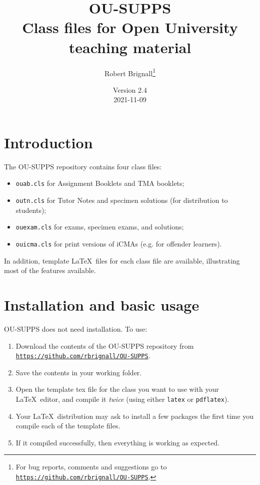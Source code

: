\documentclass[a4paper]{ltxguide}
\title{\textsf{OU-SUPPS}\\Class files for Open University teaching material}
\author{Robert Brignall\footnote{For bug reports, comments and
suggestions go to \href{https://github.com/rbrignall/OU-SUPPS}%
{\texttt{https://github.com/rbrignall/OU-SUPPS}}.}}
\date{Version 2.4\\2021-11-09}
\newcommand\3{\unskip\enspace\fbox{\fontsize{4}{4}\selectfont NEW 3.0}}
\begin{document}
\maketitle

\tableofcontents

\section{Introduction}

The \textsf{OU-SUPPS} repository contains four class files:
\begin{itemize}
\item \texttt{ouab.cls} for Assignment Booklets and TMA booklets;
\item \texttt{outn.cls} for Tutor Notes and specimen solutions (for distribution to students);
\item \texttt{ouexam.cls} for exams, specimen exams, and solutions;
\item \texttt{ouicma.cls} for print versions of iCMAs (e.g. for offender learners).
\end{itemize}

In addition, template \LaTeX\ files for each class file are available, illustrating most of the features available.

\section{Installation and basic usage}

\textsf{OU-SUPPS} does not need installation. To use:

\begin{enumerate}
\item Download the contents of the \textsf{OU-SUPPS} repository from \href{https://github.com/rbrignall/OU-SUPPS}%
{\texttt{https://github.com/rbrignall/OU-SUPPS}}.
\item Save the contents in your working folder.
\item Open the template tex file for the class you want to use with your \LaTeX\ editor, and compile it \emph{twice} (using either \texttt{latex} or \texttt{pdflatex}). 
\item Your \LaTeX\ distribution may ask to install a few packages the first time you compile each of the template files.
\item If it compiled successfully, then everything is working as expected.
\end{enumerate}
\end{document}
